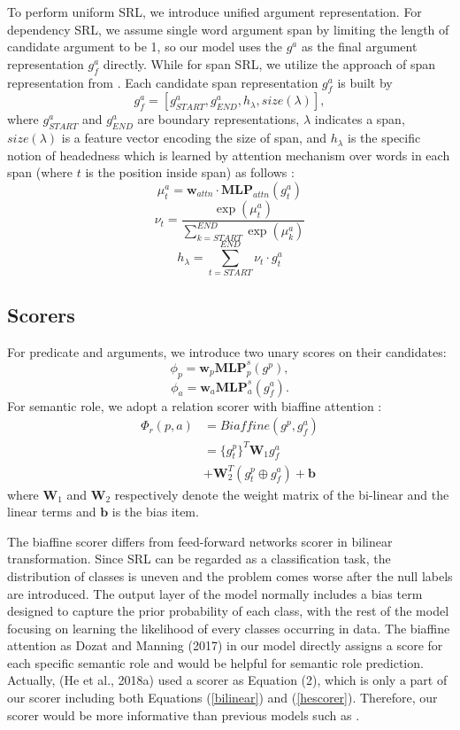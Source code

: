 \documentclass[letterpaper]{article} \usepackage{aaai19}  \usepackage{times}  \usepackage{helvet}  \usepackage{courier}  \usepackage{url}  \usepackage{graphicx}  \frenchspacing  \setlength{\pdfpagewidth}{8.5in}  \setlength{\pdfpageheight}{11in}
\begin{document}
To  perform uniform SRL, we introduce unified argument representation. For dependency SRL, we assume single word argument span by limiting the length of candidate argument to be 1, so our model uses the $g^a$ as the final argument representation $g^a_f$ directly. While for span SRL, we utilize the approach of span representation from \citeauthor{lee2017end} . Each candidate span representation $g^a_f$ is built by
\begin{equation}
g^a_f = [g^a_{\textit{START}} , g^a_{\textit{END}} , h_\lambda , size(\lambda)],\nonumber
\end{equation}
where $g_{START}^a$  and $g_{END}^a$ are boundary representations, $\lambda$ indicates a span, $size(\lambda)$ is a feature vector encoding the size of span, and $h_\lambda$ is the specific notion of headedness which is learned by attention mechanism \cite{bahdanau2014neural} over words in each span (where $t$ is the position inside span) as follows :
$$\mu^a_t = \textbf{w}_{attn} \cdot \textbf{MLP}_{attn} (g^a_t)$$ 
$$\nu_t = \frac{\exp(\mu^a_t)}{\sum_{k=\textit{START}}^{\textit{END}} \exp(\mu^a_k)}$$
$$h_{\lambda} = \sum_{t=\textit{START}}^{\textit{END}} \nu_t \cdot g^a_t$$




\subsection{Scorers}For predicate and arguments, we introduce two unary scores on their candidates:
$$\phi_p = \textbf{w}_p \textbf{MLP}^s_p(g^p),$$
$$\phi_a = \textbf{w}_a \textbf{MLP}^s_a(g_f^a).$$
For semantic role,
we adopt a relation scorer with biaffine attention \cite{dozat2017deep}:
\begin{align}
\Phi_{r}(p, a) &= \textit{Biaffine}(g^p, g^a_f)\nonumber\\
	 &= \{g^p_t\}^T \textbf{W}_1 g^a_f \label{bilinear}\\
	&+ \textbf{W}_2^T (g^p_t \oplus g^a_f) + \textbf{b} \label{hescorer}
\end{align}
where $\textbf{W}_1$ and $\textbf{W}_2$ respectively denote the weight matrix of the bi-linear and the linear terms and $\textbf{b}$ is the bias item.

The biaffine scorer differs from feed-forward networks scorer in bilinear transformation. Since SRL can be regarded as a classification task, the distribution of classes is uneven and the problem comes worse after the null labels are introduced. The output layer of the model normally includes a bias term designed to capture the prior probability of each class, with the rest of the model focusing on learning the likelihood of every classes occurring in data. 
The biaffine attention as Dozat and Manning (2017) in our model directly assigns a score for each specific semantic role and would be helpful for semantic role prediction. Actually, (He et al., 2018a) used a scorer as Equation (2), which is only a part of our scorer including both Equations (\ref{bilinear}) and (\ref{hescorer}). Therefore, our scorer would be more informative than previous models such as \cite{he2018jointly}.
\end{document}
